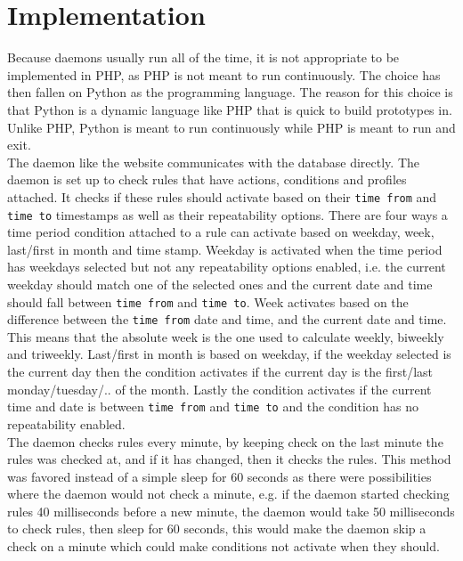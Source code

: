 \section{Implementation}
Because daemons usually run all of the time, it is not appropriate to be implemented in PHP, as PHP is not meant to run continuously. The choice has then fallen on Python as the programming language. The reason for this choice is that Python is a dynamic language like PHP that is quick to build prototypes in. Unlike PHP, Python is meant to run continuously while PHP is meant to run and exit. \\
The daemon like the website communicates with the database directly. The daemon is set up to check rules that have actions, conditions and profiles attached. It checks if these rules should activate based on their \texttt{time from} and \texttt{time to} timestamps as well as their repeatability options. There are four ways a time period condition attached to a rule can activate based on weekday, week, last/first in month and time stamp. Weekday is activated when the time period has weekdays selected but not any repeatability options enabled, i.e. the current weekday should match one of the selected ones and the current date and time should fall between \texttt{time from} and \texttt{time to}. Week activates based on the difference between the \texttt{time from} date and time, and the current date and time. This means that the absolute week is the one used to calculate weekly, biweekly and triweekly. Last/first in month is based on weekday, if the weekday selected is the current day then the condition activates if the current day is the first/last monday/tuesday/.. of the month. Lastly the condition activates if the current time and date is between \texttt{time from} and \texttt{time to} and the condition has no repeatability enabled. \\
The daemon checks rules every minute, by keeping check on the last minute the rules was checked at, and if it has changed, then it checks the rules. This method was favored instead of a simple sleep for 60 seconds as there were possibilities where the daemon would not check a minute, e.g. if the daemon started checking rules 40 milliseconds before a new minute, the daemon would take 50 milliseconds to check rules, then sleep for 60 seconds, this would make the daemon skip a check on a minute which could make conditions not activate when they should.